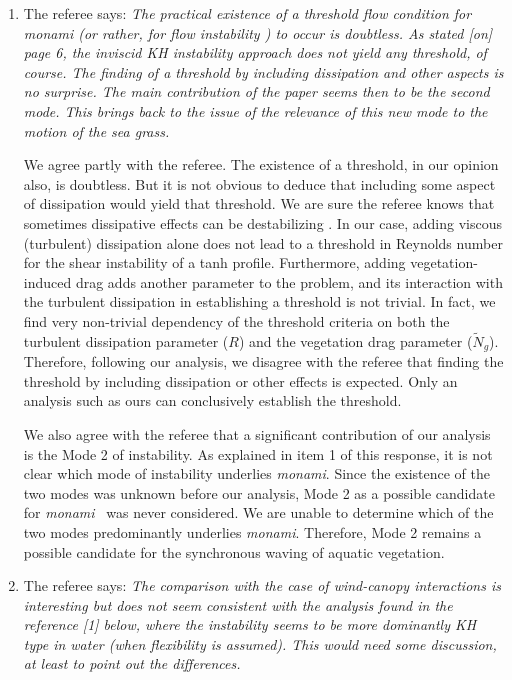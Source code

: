 \documentclass[letterpaper,10pt]{article}
\newcommand{\Rey}{{R}}
\newcommand{\Ndg}{\tilde{N}_g}
\newcommand{\monami}{\textit{monami}}
\begin{document}
\begin{enumerate}
\item The referee says:
\textit{
The practical existence of a threshold flow condition for monami (or rather,  for flow instability ) to occur is doubtless.  As stated [on] page 6, the inviscid KH instability approach does not yield any threshold, of course. The finding of a threshold by including dissipation and other aspects is no surprise. The main contribution of the paper seems then to be the second mode. This brings back to the issue of the relevance of this new mode to the motion of the sea grass.
}

We agree partly with the referee. The existence of a threshold, in our opinion also, is doubtless. 
But it is not obvious to deduce that including some aspect of dissipation would yield that threshold. 
We are sure the referee knows that sometimes dissipative effects can be destabilizing \citep{Krechetnikov2007}. 
In our case, adding viscous (turbulent) dissipation alone does not lead to a threshold in Reynolds number for the shear instability of a tanh profile. 
Furthermore, adding vegetation-induced drag adds another parameter to the problem, and its interaction with the turbulent dissipation in establishing a threshold is not trivial. 
In fact, we find very non-trivial dependency of the threshold criteria on both the turbulent dissipation parameter ($\Rey$) and the vegetation drag parameter ($\Ndg$). 
Therefore, following our analysis, we disagree with the referee that finding the threshold  by including dissipation or other effects is expected. 
Only an analysis such as ours can conclusively establish the threshold.

We also agree with the referee that a significant contribution of our analysis is the Mode 2 of instability.
As explained in item 1 of this response, it is not clear which mode of instability underlies \monami.
Since the existence of the two modes was unknown before our analysis, Mode 2 as a possible candidate for \monami~ was never considered. 
We are unable to determine which of the two modes predominantly underlies \monami.
Therefore, Mode 2 remains a possible candidate for the synchronous waving of aquatic vegetation.

\item The referee says:
\textit{
The comparison with the case of wind-canopy interactions is interesting but does not seem consistent with the analysis found in the reference [1]  below, where the instability seems to be more dominantly KH type in water  (when flexibility is assumed).  This would need some discussion, at least to point out the differences.
}


\end{enumerate}
\end{document}
